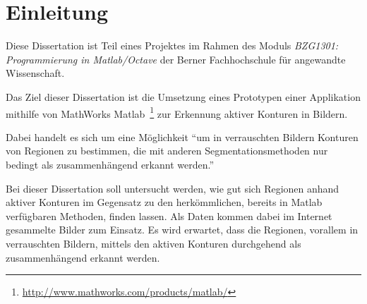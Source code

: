 \chapter{Einleitung}
\label{chap:intro}

Diese Dissertation ist Teil eines Projektes im Rahmen des Moduls \textit{BZG1301: Programmierung in Matlab/Octave} der Berner Fachhochschule für angewandte Wissenschaft.

Das Ziel dieser Dissertation ist die Umsetzung eines Prototypen einer Applikation mithilfe von MathWorks Matlab~\footnote{\url{http://www.mathworks.com/products/matlab/}} zur Erkennung \gls{aktiver Konturen} in Bildern.

Dabei handelt es sich um eine Möglichkeit ``um in verrauschten Bildern Konturen von Regionen zu bestimmen, die mit anderen \gls{Segmentationsmethoden} nur bedingt als zusammenhängend erkannt werden.''~\cite[S. 144]{hudritsch:script:cp}

Bei dieser Dissertation soll untersucht werden, wie gut sich Regionen anhand aktiver Konturen im Gegensatz zu den herkömmlichen, bereits in Matlab verfügbaren Methoden, finden lassen. Als Daten kommen dabei im Internet gesammelte Bilder zum Einsatz. Es wird erwartet, dass die Regionen, vorallem in verrauschten Bildern, mittels den aktiven Konturen durchgehend als zusammenhängend erkannt werden.

%  
